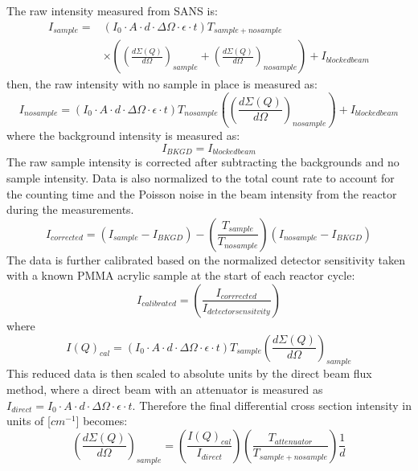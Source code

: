 The raw intensity measured from SANS is:
\begin{equation}
\begin{aligned}
        I_{sample} = & \left( I_0 \cdot A \cdot d \cdot \Delta \Omega \cdot \epsilon \cdot t \right) T_{sample+nosample} \\ & \times \left( \left(\frac{d\Sigma(Q)}{d\Omega}\right)_{sample}  + \left(\frac{d\Sigma(Q)}{d\Omega}\right)_{nosample} \right) + I_{blockedbeam} 
\end{aligned}
\end{equation}
then, the raw intensity with no sample in place is measured as:
\begin{equation}
    I_{nosample} = \left( I_0 \cdot A \cdot d \cdot \Delta \Omega \cdot \epsilon \cdot t \right) T_{nosample} \left( \left(\frac{d\Sigma(Q)}{d\Omega}\right)_{nosample}      \right) + I_{blockedbeam} 
\end{equation}
where the background intensity is measured as:
\begin{equation}
    I_{BKGD} =  I_{blockedbeam} 
\end{equation}
The raw sample intensity is corrected after subtracting the backgrounds and no sample intensity. Data is also normalized to the total count rate to account for the counting time and the Poisson noise in the beam intensity from the reactor during the measurements. 
\begin{equation}
    I_{corrected} = \left( I_{sample} - I_{BKGD} \right) - \left(  \frac{T_{sample}}{T_{no sample}} \right) \left( I_{nosample} - I_{BKGD} \right)
\end{equation}
The data is further calibrated based on the normalized detector sensitivity taken with a known PMMA acrylic sample at the start of each reactor cycle:
\begin{equation}
    I_{calibrated} =  \left(  \frac{I_{corrrected}}{I_{detector sensitvity}} \right) 
\end{equation}
where
\begin{equation}
    I(Q)_{cal} = \left( I_0 \cdot A \cdot d \cdot \Delta \Omega \cdot \epsilon \cdot t \right) T_{sample} \left( \frac{d\Sigma(Q)}{d\Omega}  \right)_{sample} 
\end{equation}
This reduced data is then scaled to absolute units by the direct beam flux method, where a direct beam with an attenuator is measured as $ I_{direct} = I_0 \cdot A \cdot d \cdot \Delta \Omega \cdot \epsilon \cdot t $. Therefore the final differential cross section intensity in units of [$cm^{-1}$] becomes:
\begin{equation}
   \left( \frac{d\Sigma(Q)}{d\Omega}  \right)_{sample} = \left ( \frac{I(Q)_{cal}}{I_{direct}}  \right)  \left ( \frac{T_{attenuator}}{T_{sample+nosample}}  \right) \frac{1}{d} 
\end{equation}

